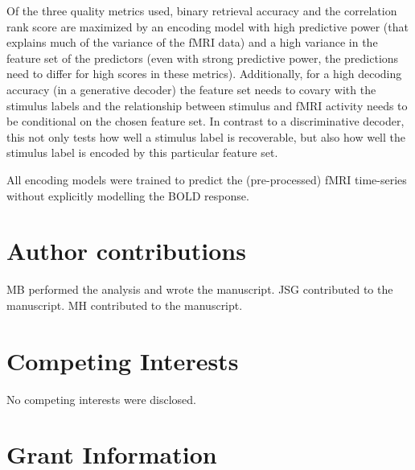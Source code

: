 Of the three quality metrics used, binary retrieval accuracy and the
correlation rank score are maximized by an encoding model with high predictive
power (that explains much of the variance of the f{MRI} data) and a high
variance in the feature set of the predictors (even with strong predictive
power, the predictions need to differ for high scores in these metrics).
Additionally, for a high decoding accuracy (in a generative decoder) the
feature set needs to covary with the stimulus labels and the relationship
between stimulus and f{MRI} activity needs to be conditional on the chosen
feature set. In contrast to a discriminative decoder, this not only tests how
well a stimulus label is recoverable, but also how well the stimulus label is
encoded by this particular feature set.

All encoding models were trained to predict the (pre-processed) f{MRI}
time-series without explicitly modelling the BOLD response. 







\section*{Author contributions}

MB performed the analysis and wrote the manuscript.
JSG contributed to the manuscript.
MH contributed to the manuscript.


\section*{Competing Interests}
No competing interests were disclosed.

\section*{Grant Information}

